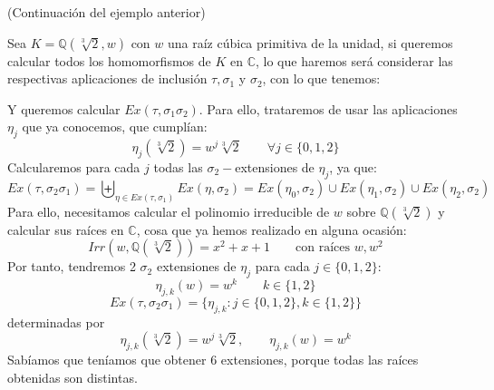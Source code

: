 \begin{ejemplo}
    (Continuación del ejemplo anterior)

    \noindent
    Sea $K = \mathbb{Q}\left(\sqrt[3]{2},w\right)$ con $w$ una raíz cúbica primitiva de la unidad, si queremos calcular todos los homomorfismos de $K$ en $\mathbb{C}$, lo que haremos será considerar las respectivas aplicaciones de inclusión $\tau,\sigma_1$ y $\sigma_2$, con lo que tenemos:
    \begin{figure}[H]
        \centering
    \end{figure}
    \noindent
    Y queremos calcular $Ex(\tau,\sigma_1\sigma_2)$. Para ello, trataremos de usar las aplicaciones $\eta_j$ que ya conocemos, que cumplían:
    \begin{equation*}
        \eta_j\left(\sqrt[3]{2}\right) = w^j \sqrt[3]{2} \qquad \forall j \in \{0,1,2\}
    \end{equation*}
    Calcularemos para cada $j$ todas las $\sigma_2-$extensiones de $\eta_j$, ya que:
    \begin{equation*}
        Ex(\tau,\sigma_2\sigma_1) = \biguplus_{\eta \in  Ex(\tau,\sigma_1)}Ex(\eta, \sigma_2) = Ex(\eta_0,\sigma_2) \cup Ex(\eta_1, \sigma_2) \cup Ex(\eta_2,\sigma_2)
    \end{equation*}
    Para ello, necesitamos calcular el polinomio irreducible de $w$ sobre $\mathbb{Q}\left(\sqrt[3]{2}\right)$ y calcular sus raíces en $\mathbb{C}$, cosa que ya hemos realizado en alguna ocasión:
    \begin{equation*}
        Irr\left(w,\mathbb{Q}\left(\sqrt[3]{2}\right)\right) = x^2+x+1 \qquad \text{con raíces\ } w, w^2
    \end{equation*}
    Por tanto, tendremos 2 $\sigma_2$ extensiones de $\eta_j$ para cada $j \in \{0,1,2\}$:
    \begin{equation*}
        \eta_{j,k}(w) = w^k \qquad k \in \{1,2\}
    \end{equation*}
    \begin{equation*}
        Ex(\tau,\sigma_2\sigma_1) = \{\eta_{j,k} : j\in \{0,1,2\}, k\in \{1,2\}\}
    \end{equation*}
    determinadas por
    \begin{equation*}
        \eta_{j,k}\left(\sqrt[3]{2}\right) = w^j\sqrt[3]{2}, \qquad \eta_{j,k}(w)= w^k
    \end{equation*}
    Sabíamos que teníamos que obtener 6 extensiones, porque todas las raíces obtenidas son distintas.
\end{ejemplo}

